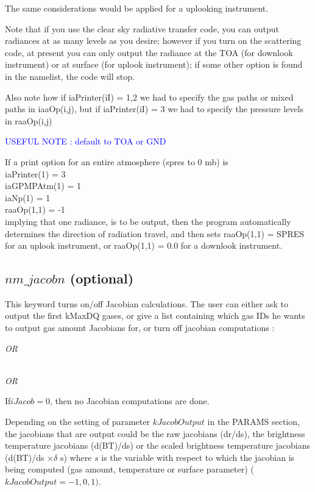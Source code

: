 \documentclass[12pt]{article}
\newcommand{\ttab}{\indent\indent}
\begin{document}
{{The same considerations would be applied for a uplooking instrument.

Note that if you use the clear sky radiative transfer code, you 
can output radiances at as many levels as you desire; however if you turn on
the scattering code, at present you can only output the radiance at the TOA 
(for downlook instrument) or at surface (for uplook instrument); if some other
option is found in the namelist, the code will stop.

Also note how if iaPrinter(iI) = 1,2 we had to specify the gas paths
or mixed paths in iaaOp(i,j), but if iaPrinter(iI) = 3 we had to specify the 
pressure levels in raaOp(i,j)

\textcolor{blue}
{USEFUL NOTE : default to TOA or GND}

If a print option for an entire atmosphere (spres to 0 mb) is \\
\medskip
\ttab iaPrinter(1) = 3\\
\ttab iaGPMPAtm(1) = 1\\
\ttab iaNp(1)      = 1\\
\ttab raaOp(1,1)   = -1\\
implying that one radiance, is to be output, then
the program automatically determines the direction of radiation travel, and 
then sets raaOp(1,1) = SPRES for an uplook instrument, or raaOp(1,1) = 0.0
for a downlook instrument.

\subsection{$nm\_jacobn$ (optional)}

This keyword turns on/off Jacobian calculations.  
The user can either ask to output the first kMaxDQ gases, or give a list 
containing which gas IDs he wants to output gas amount Jacobians for, or
turn off jacobian computations :

\smallskip
\ttab {\sf iJacob = -1}

{\em OR} \\

\ttab {\sf iJacob = n}\\
\ttab {\sf g1  g2  ... gn}

{\em OR} \\
\ttab {\sf iJacob = 0}

If$iJacob = 0$, then no Jacobian computations are done. 

Depending on the setting of parameter $kJacobOutput$ in the PARAMS section,
the jacobians that are output could be the raw jacobians (dr/ds), 
the brightness temperature jacobians (d(BT)/ds) or the scaled
brightness temperature jacobians (d(BT)/ds $\times \delta$ s) where $s$ is the
variable with respect to which the jacobian is being computed (gas amount,
temperature or surface parameter) ($kJacobOutput = -1,0,1)$.

}}
\end{document}
